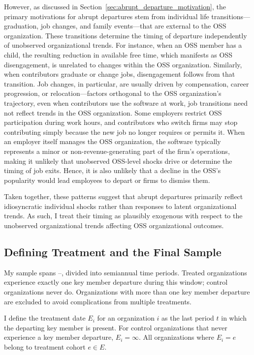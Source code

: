 \documentclass[12pt,notitlepage]{article}
\begin{document}
However, as discussed in Section~\ref{sec:abrupt_departure_motivation}, the primary motivations for abrupt departures stem from individual life transitions---graduation, job changes, and family events---that are external to the OSS organization.
These transitions determine the timing of departure independently of unobserved organizational trends.
For instance, when an OSS member has a child, the resulting reduction in available free time, which manifests as OSS disengagement, is unrelated to changes within the OSS organization.
Similarly, when contributors graduate or change jobs, disengagement follows from that transition.
Job changes, in particular, are usually driven by compensation, career progression, or relocation—factors orthogonal to the OSS organization’s trajectory,
even when contributors use the software at work, job transitions need not reflect trends in the OSS organization.
Some employers restrict OSS participation during work hours, and contributors who switch firms may stop contributing simply because the new job no longer requires or permits it.
When an employer itself manages the OSS organization, the software typically represents a minor or non-revenue-generating part of the firm’s operations, making it unlikely that unobserved OSS-level shocks drive or determine the timing of job exits. 
Hence, it is also unlikely that a decline in the OSS’s popularity would lead employees to depart or firms to dismiss them.


Taken together, these patterns suggest that abrupt departures primarily reflect idiosyncratic individual shocks rather than responses to latent organizational trends.
As such, I treat their timing as plausibly exogenous with respect to the unobserved organizational trends affecting OSS organizational outcomes.

\subsection{Defining Treatment and the Final Sample} \label{sec:treatment_sample}
My sample spans \SampleStart--\SampleEnd, divided into semiannual time periods. 
Treated organizations experience exactly one key member departure during this window; control organizations never do. 
Organizations with more than one key member departure are excluded to avoid complications from multiple treatments.

I define the treatment date $E_i$ for an organization $i$ as the last period  $t$ in which the departing key member is present. 
For control organizations that never experience a key member departure, $E_i = \infty$.
All organizations where $E_i = e$ belong to treatment cohort $e \in E$. 
\end{document}
